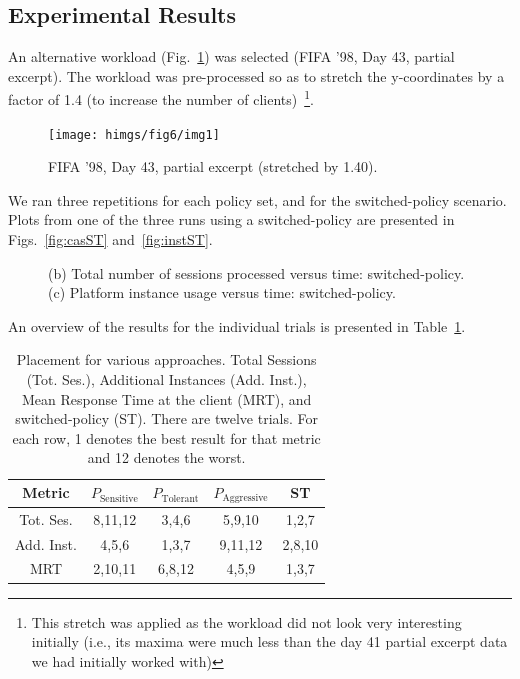 \subsection{Experimental Results}
An alternative workload (Fig.~\ref{fig:workload43140}) was selected (FIFA '98, Day 43, partial excerpt).   
The workload was pre-processed so as to stretch the y-coordinates by a factor of 1.4 (to increase the number of clients)~\footnote{This stretch was applied as the workload did not look very interesting initially (i.e., its maxima were much less than the day 41 partial excerpt data we had initially worked with)}.  
\begin{figure}[h]
  \centering
	\texttt{[image: himgs/fig6/img1]}
    \caption{ FIFA '98, Day 43, partial excerpt (stretched by 1.40). }
		  \label{fig:workload43140}
\end{figure}

We ran three repetitions for each policy set, and for the switched-policy scenario. 
 Plots from one of the three runs using a switched-policy are presented in Figs.~\ref{fig:casST} and~\ref{fig:instST}.

\begin{figure}[h]
  \centering
    \caption{(b) Total number of sessions processed versus time: switched-policy. 
		(c) Platform instance usage versus time:  switched-policy.}
	\label{fig:stexp3}
\end{figure}

An overview of the results for the individual trials is presented in Table~\ref{tab:approaches}.  
 \begin{table}
 \caption{Placement for various approaches. Total Sessions (Tot. Ses.), Additional Instances (Add. Inst.), Mean Response Time at the client (MRT), and  switched-policy (ST). There are twelve trials. For each row, 1 denotes the best result for that metric and 12 denotes the worst.}
	\label{tab:approaches}
 \center
 \begin{tabular}{ |c || c | c | c |c | }
   \hline \hline
    Metric &  $P_\text{Sensitive}$ & $P_\text{Tolerant}$ & $P_\text{Aggressive}$ & ST \\
    \hline
    Tot. Ses. & 8,11,12 & 3,4,6 & 5,9,10 &  1,2,7   \\
    Add. Inst. & 4,5,6 & 1,3,7 & 9,11,12 & 2,8,10 \\
    MRT & 2,10,11 & 6,8,12 & 4,5,9 & 1,3,7 \\
    \hline \hline
 \end{tabular}
  \end{table}
 
